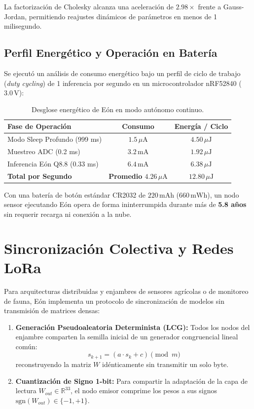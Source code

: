 \documentclass[10pt,twocolumn]{article}
\begin{document}
La factorización de Cholesky alcanza una aceleración de $2.98\times$ frente a Gauss-Jordan, permitiendo reajustes dinámicos de parámetros en menos de 1 milisegundo.

\subsection{Perfil Energético y Operación en Batería}

Se ejecutó un análisis de consumo energético bajo un perfil de ciclo de trabajo (\textit{duty cycling}) de 1 inferencia por segundo en un microcontrolador nRF52840 ($3.0\,\text{V}$):

\begin{table}[h]
\centering
\small
\begin{tabular}{lcc}
\toprule
\textbf{Fase de Operación} & \textbf{Consumo} & \textbf{Energía / Ciclo} \\
\midrule
Modo Sleep Profundo (999 ms) & $1.5\,\mu\text{A}$ & $4.50\,\mu\text{J}$ \\
Muestreo ADC (0.2 ms) & $3.2\,\text{mA}$ & $1.92\,\mu\text{J}$ \\
Inferencia Eón Q8.8 (0.33 ms) & $6.4\,\text{mA}$ & $6.38\,\mu\text{J}$ \\
\midrule
\textbf{Total por Segundo} & \textbf{Promedio $4.26\,\mu\text{A}$} & \textbf{$12.80\,\mu\text{J}$} \\
\bottomrule
\end{tabular}
\caption{Desglose energético de Eón en modo autónomo continuo.}
\label{tab:energy_budget}
\end{table}

Con una batería de botón estándar CR2032 de $220\,\text{mAh}$ ($660\,\text{mWh}$), un nodo sensor ejecutando Eón opera de forma ininterrumpida durante más de \textbf{5.8 años} sin requerir recarga ni conexión a la nube.

\section{Sincronización Colectiva y Redes LoRa}

Para arquitecturas distribuidas y enjambres de sensores agrícolas o de monitoreo de fauna, Eón implementa un protocolo de sincronización de modelos sin transmisión de matrices densas:
\begin{enumerate}
    \item \textbf{Generación Pseudoaleatoria Determinista (LCG):} Todos los nodos del enjambre comparten la semilla inicial de un generador congruencial lineal común:
    \begin{equation}
    s_{k+1} = (a \cdot s_k + c) \pmod m
    \end{equation}
    reconstruyendo la matriz $W$ idénticamente sin transmitir un solo byte.
    \item \textbf{Cuantización de Signo 1-bit:} Para compartir la adaptación de la capa de lectura $W_{out} \in \mathbb{R}^{33}$, el nodo emisor comprime los pesos a sus signos $\text{sgn}(W_{out}) \in \{-1, +1\}$.
\end{enumerate}
\end{document}
